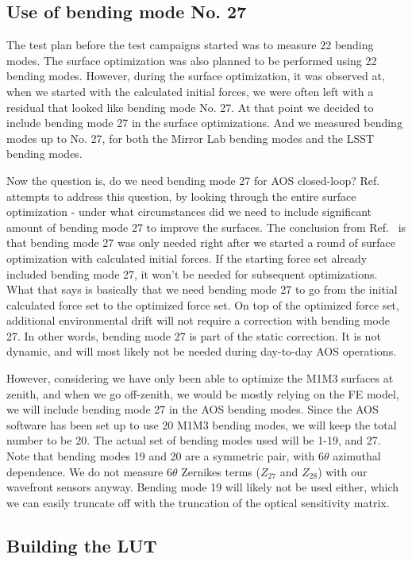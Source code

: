 \documentclass [twoside,openbib,12pt]{article}
\begin{document}
\subsection{Use of bending mode No. 27}

The test plan before the test campaigns started was to measure 22
bending modes. The surface optimization was also planned to be
performed using 22 bending modes.
However, during the surface optimization, it was observed at, when we
started with the calculated initial forces, we were often left with a
residual that looked like bending mode No. 27.
At that point we decided to include bending mode 27 in the surface
optimizations. And we measured bending modes up to No. 27, for both
the Mirror Lab bending modes and the LSST bending modes.

Now the question is,
do we need bending mode 27 for AOS closed-loop?
Ref.~\cite{m1m3bm27} attempts to address this question, by looking through
the entire surface optimization - under what circumstances did we need
to include significant amount of bending mode 27 to improve the
surfaces.
The conclusion from Ref.~\cite{m1m3bm27} is that bending mode 27 was only
needed right after we started a round of surface optimization with
calculated initial forces. If the
starting force set already included bending mode 27, it won't be
needed for subsequent optimizations.
What that says is basically that we need bending mode 27 to go from
the initial calculated force set to the optimized force set. On top of
the optimized force set, additional environmental drift will not
require a correction with bending mode 27. In other words, bending
mode 27 is part of the static correction. It is not dynamic, and will
most likely not be needed during day-to-day AOS operations.

However, considering we have only been able to optimize the M1M3
surfaces at zenith, and when we go off-zenith, we would be mostly relying
on the FE model, we will include bending mode 27 in the AOS bending
modes.
Since the AOS software has been set up to use 20 M1M3 bending modes,
we will keep the total number to be 20. The actual set of bending
modes used will be 1-19, and 27.
Note that bending modes 19 and 20 are a symmetric pair, with $6\theta$
azimuthal dependence.
We do not measure $6\theta$ Zernikes terms ($Z_{27}$ and $Z_{28}$) with
our wavefront sensors anyway.
Bending mode 19 will likely not be used either, which we can easily
truncate off with the truncation of the optical sensitivity matrix.

\subsection{Building the LUT}
\label{sec:LUT}
\end{document}
